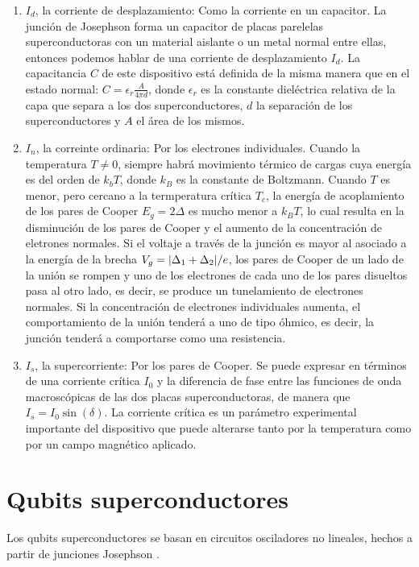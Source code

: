 \begin{enumerate}
    \item $I_d$, la corriente de desplazamiento: Como la corriente en un capacitor. La junción de Josephson forma un capacitor de placas parelelas superconductoras con un material aislante o un metal normal entre ellas, entonces podemos hablar de una corriente de desplazamiento $I_d$. La capacitancia $C$ de este dispositivo está definida de la misma manera que en el estado normal: $C = \epsilon_r \frac{A}{4 \pi d}$, donde $\epsilon_r$ es la constante dieléctrica relativa de la capa que separa a los dos superconductores, $d$ la separación de los superconductores y $A$ el área de los mismos.
    \item $I_n$, la correinte ordinaria: Por los electrones individuales. Cuando la temperatura $T \neq 0$, siempre habrá movimiento térmico de cargas cuya energía es del orden de $k_b T$, donde $k_B$ es la constante de Boltzmann. Cuando $T$ es menor, pero cercano a la termperatura crítica $T_c$, la energía de acoplamiento de los pares de Cooper $E_g = 2 \Delta$ es mucho menor a $k_B T$, lo cual resulta en la disminución de los pares de Cooper y el aumento de la concentración de eletrones normales. Si el voltaje a través de la junción es mayor al asociado a la energía de la brecha $V_g = \abs{\Delta_1 + \Delta_2}/e$, los pares de Cooper de un lado de la unión se rompen y uno de los electrones de cada uno de los pares disueltos pasa al otro lado, es decir, se produce un tunelamiento de electrones normales. Si la concentración de electrones individuales aumenta, el comportamiento de la unión tenderá a uno de tipo óhmico, es decir, la junción tenderá a comportarse como una resistencia.
    \item $I_s$, la supercorriente: Por los pares de Cooper. Se puede expresar en términos de una corriente crítica $I_0$ y la diferencia de fase entre las funciones de onda macroscópicas de las dos placas superconductoras, de manera que $I_s = I_0 \sin(\delta)$. La corriente crítica es un parámetro experimental importante del dispositivo que puede alterarse tanto por la temperatura como por un campo magnético aplicado.
\end{enumerate}

\section{Qubits superconductores}
Los qubits superconductores se basan en circuitos osciladores no lineales, hechos a partir de junciones Josephson \cite{wendin}.

